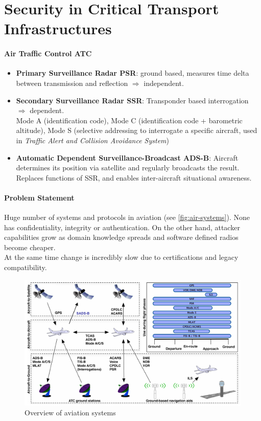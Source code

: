 \section{Security in Critical Transport Infrastructures}


\paragraph{Air Traffic Control ATC}
\begin{itemize}
	\item \textbf{Primary Surveillance Radar PSR}:
	ground based, measures time delta between transmission and reflection $\Rightarrow$ independent.
	\item \textbf{Secondary Surveillance Radar SSR}:
	Transponder based interrogation $\Rightarrow$ dependent. \\
	Mode A (identification code), Mode C (identification code + barometric altitude), Mode S (selective addressing to interrogate a specific aircraft, used in \textit{Traffic Alert and Collision Avoidance System})
	\item \textbf{Automatic Dependent Surveillance-Broadcast ADS-B}:
	Aircraft determines its position via satellite and regularly broadcasts the result.
	Replaces functions of SSR, and enables inter-aircraft situational awareness.
\end{itemize}

\paragraph{Problem Statement}
Huge number of systems and protocols in aviation (see \autoref{fig:air-systems}).
None has confidentiality, integrity or authentication.
On the other hand, attacker capabilities grow as domain knowledge spreads and software defined radios become cheaper.
\\
At the same time change is incredibly slow due to certifications and legacy compatibility.

\begin{figure}[h]
	\centering
	\includegraphics[scale=0.5]{images/6-air-systems.png}
	\caption{Overview of aviation systems}
	\label{fig:air-systems}
\end{figure}



